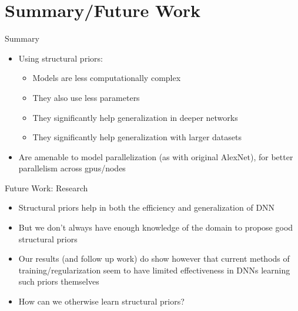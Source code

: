 \documentclass[t,xcolor=dvipsnames]{beamer}
\begin{document}
\usebackgroundtemplate{}

\section{Summary/Future Work}

\begin{frame}{Summary}

  \begin{itemize}
	\item Using structural priors:
	\begin{itemize}
    	\item Models are \alert{less computationally complex}
	    \item They also use \alert{less parameters}
	    \item They significantly help generalization in \alert{deeper networks}
        \item They significantly help generalization with \alert{larger datasets}
	\end{itemize}
	\item Are amenable to \alert{model parallelization} (as with original AlexNet), for better parallelism across gpus/nodes
  \end{itemize}
\end{frame}

\begin{frame}{Future Work: Research}
    \begin{itemize}
        \item Structural priors help in both the efficiency and generalization of DNN
        \item But we don't always have enough knowledge of the domain to propose good structural priors
        \item Our results (and follow up work) do show however that current methods of training/regularization seem to have limited effectiveness in DNNs learning such priors themselves
        \item How can we otherwise learn structural priors?
    \end{itemize}
\end{frame}
\end{document}
